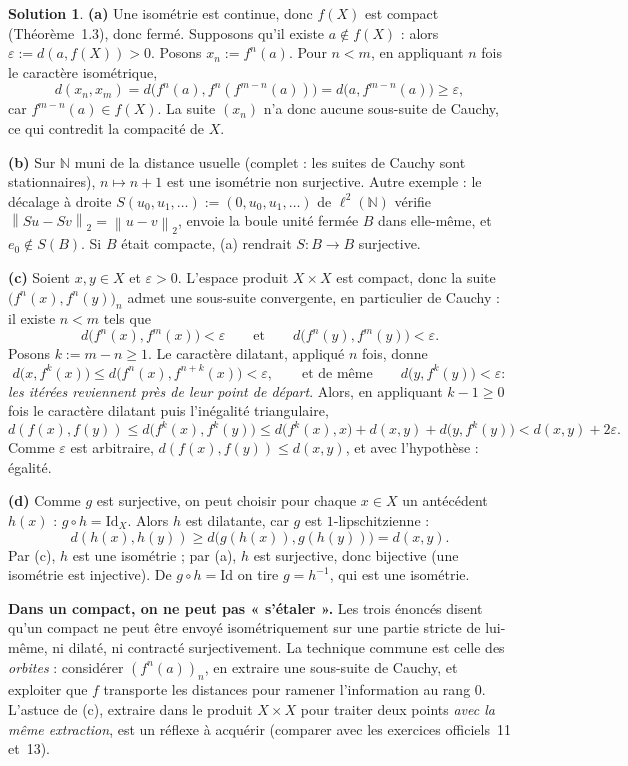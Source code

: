 \documentclass[11pt,a4paper]{article}
\newcommand{\N}{\mathbb{N}}
\newcommand{\norm}[1]{\left\|#1\right\|}
\theoremstyle{definition}
\newtheorem*{solution}{Solution}
\begin{document}
\begin{solution}
\noindent\textbf{(a)} Une isométrie est continue, donc $f(X)$ est compact (Théorème~1.3), donc fermé. Supposons qu'il existe $a\notin f(X)$ : alors $\varepsilon:=d(a,f(X))>0$. Posons $x_n:=f^n(a)$. Pour $n<m$, en appliquant $n$ fois le caractère isométrique,
\[
d(x_n,x_m)=d\big(f^n(a),f^n(f^{m-n}(a))\big)=d\big(a,f^{m-n}(a)\big)\ge\varepsilon,
\]
car $f^{m-n}(a)\in f(X)$. La suite $(x_n)$ n'a donc aucune sous-suite de Cauchy, ce qui contredit la compacité de $X$.

\medskip
\noindent\textbf{(b)} Sur $\N$ muni de la distance usuelle (complet : les suites de Cauchy sont stationnaires), $n\mapsto n+1$ est une isométrie non surjective. Autre exemple : le décalage à droite $S(u_0,u_1,\dots):=(0,u_0,u_1,\dots)$ de $\ell^2(\N)$ vérifie $\norm{Su-Sv}_2=\norm{u-v}_2$, envoie la boule unité fermée $B$ dans elle-même, et $e_0\notin S(B)$. Si $B$ était compacte, (a) rendrait $S:B\to B$ surjective.

\medskip
\noindent\textbf{(c)} Soient $x,y\in X$ et $\varepsilon>0$. L'espace produit $X\times X$ est compact, donc la suite $\big(f^n(x),f^n(y)\big)_n$ admet une sous-suite convergente, en particulier de Cauchy : il existe $n<m$ tels que
\[
d\big(f^n(x),f^m(x)\big)<\varepsilon\qquad\text{et}\qquad d\big(f^n(y),f^m(y)\big)<\varepsilon .
\]
Posons $k:=m-n\ge1$. Le caractère dilatant, appliqué $n$ fois, donne
\[
d\big(x,f^k(x)\big)\le d\big(f^n(x),f^{n+k}(x)\big)<\varepsilon,\qquad\text{et de même}\qquad d\big(y,f^k(y)\big)<\varepsilon :
\]
\emph{les itérées reviennent près de leur point de départ}. Alors, en appliquant $k-1\ge0$ fois le caractère dilatant puis l'inégalité triangulaire,
\[
d(f(x),f(y))\le d\big(f^k(x),f^k(y)\big)\le d\big(f^k(x),x\big)+d(x,y)+d\big(y,f^k(y)\big)<d(x,y)+2\varepsilon .
\]
Comme $\varepsilon$ est arbitraire, $d(f(x),f(y))\le d(x,y)$, et avec l'hypothèse : égalité.

\medskip
\noindent\textbf{(d)} Comme $g$ est surjective, on peut choisir pour chaque $x\in X$ un antécédent $h(x)$ : $g\circ h=\mathrm{Id}_X$. Alors $h$ est dilatante, car $g$ est $1$-lipschitzienne :
\[
d(h(x),h(y))\ge d\big(g(h(x)),g(h(y))\big)=d(x,y) .
\]
Par (c), $h$ est une isométrie ; par (a), $h$ est surjective, donc bijective (une isométrie est injective). De $g\circ h=\mathrm{Id}$ on tire $g=h^{-1}$, qui est une isométrie.
\end{solution}

\begin{pointcle}
\textbf{Dans un compact, on ne peut pas « s'étaler ».} Les trois énoncés disent qu'un compact ne peut être envoyé isométriquement sur une partie stricte de lui-même, ni dilaté, ni contracté surjectivement. La technique commune est celle des \emph{orbites} : considérer $(f^n(a))_n$, en extraire une sous-suite de Cauchy, et exploiter que $f$ transporte les distances pour ramener l'information au rang $0$. L'astuce de (c), extraire dans le produit $X\times X$ pour traiter deux points \emph{avec la même extraction}, est un réflexe à acquérir (comparer avec les exercices officiels~11 et~13).
\end{pointcle}
\end{document}
